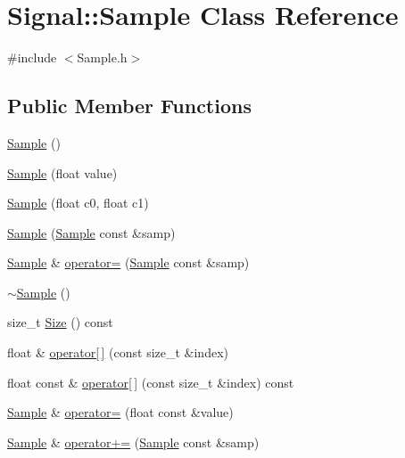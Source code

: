 \hypertarget{classSignal_1_1Sample}{\section{Signal\+:\+:Sample Class Reference}
\label{classSignal_1_1Sample}
}


{\ttfamily \#include $<$Sample.\+h$>$}

\subsection*{Public Member Functions}
\begin{DoxyCompactItemize}
\item 
\hyperlink{classSignal_1_1Sample_aff6a97034407b253ebb14d4b3a7e5477}{Sample} ()
\item 
\hyperlink{classSignal_1_1Sample_a6ecb688115872185693109a628734dc4}{Sample} (float value)
\item 
\hyperlink{classSignal_1_1Sample_a21732177867266f0780fb062428456b2}{Sample} (float c0, float c1)
\item 
\hyperlink{classSignal_1_1Sample_acc0acea8ae798078059f04e988a2640e}{Sample} (\hyperlink{classSignal_1_1Sample}{Sample} const \&samp)
\item 
\hyperlink{classSignal_1_1Sample}{Sample} \& \hyperlink{classSignal_1_1Sample_ac8baed24392811f0752bf6fab175d55a}{operator=} (\hyperlink{classSignal_1_1Sample}{Sample} const \&samp)
\item 
\hyperlink{classSignal_1_1Sample_a4968d6186f36193272bbeaf25e3da7ab}{$\sim$\+Sample} ()
\item 
size\+\_\+t \hyperlink{classSignal_1_1Sample_a3c8f635193c0b7b69612cb189766dfa3}{Size} () const 
\item 
float \& \hyperlink{classSignal_1_1Sample_a3eaf5563822c3bccefc478a8a436020a}{operator\mbox{[}$\,$\mbox{]}} (const size\+\_\+t \&index)
\item 
float const \& \hyperlink{classSignal_1_1Sample_afe8d5109121196a75539c172aa38e09a}{operator\mbox{[}$\,$\mbox{]}} (const size\+\_\+t \&index) const 
\item 
\hyperlink{classSignal_1_1Sample}{Sample} \& \hyperlink{classSignal_1_1Sample_a0b01f12ec802e075f6917f8490ac6813}{operator=} (float const \&value)
\item 
\hyperlink{classSignal_1_1Sample}{Sample} \& \hyperlink{classSignal_1_1Sample_ab70d9c9ef2561b03e0161fb72ede452c}{operator+=} (\hyperlink{classSignal_1_1Sample}{Sample} const \&samp)
\item 

\end{DoxyCompactItemize}
